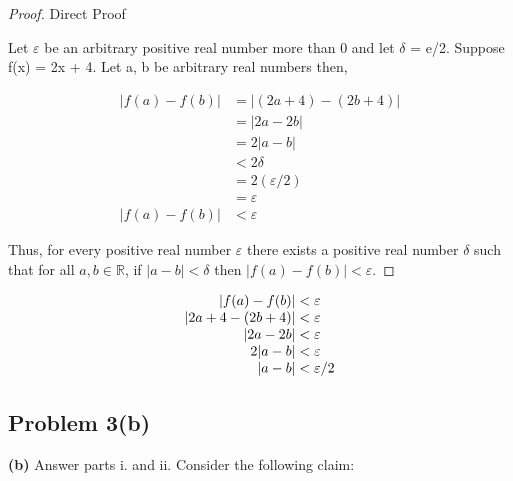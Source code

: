 \documentclass{article}
\begin{document}
\begin{proof} 

Direct Proof

\vspace{1em}
Let \( \varepsilon \) be an arbitrary positive real number more than 0 and let \( \delta \) = e/2. Suppose f(x) = 2x + 4. Let a, b be arbitrary real numbers then,
                                
\begin{align*}
    |f(a)-f(b)| &= |(2a+4)-(2b+4)| \\
                &= |2a-2b| \\
                &= 2|a-b| \\
                &<  2\delta  \\
                &=  2 (\varepsilon / 2) \\
                &= \varepsilon\\
    |f(a)-f(b)| &< \varepsilon
\end{align*}    





Thus, for every positive real number \( \varepsilon \) there exists
a positive real number \( \delta \) such that for all \( a, b \in \mathbb{R} \), if \( |a - b| < \delta \) then
\( |f(a) - f(b)| < \varepsilon \).

\end{proof}
\begin{sidework}

\begin{equation*}
\begin{gathered}
\begin{array}{r@{{}<{}}l}
|f(a)-f(b)|& \varepsilon \\
|2a+4-(2b+4)| &  \varepsilon \\
|2a-2b| & \varepsilon \\
2|a-b| & \varepsilon \\
|a-b| & \varepsilon/2 \\
\end{array}
\end{gathered}
\end{equation*}


\end{sidework}
\vspace{.25cm} %

\newpage
\subsection*{Problem 3(b)}
\noindent \textbf{(b)} Answer parts i. and ii. Consider the following claim:
\end{document}

